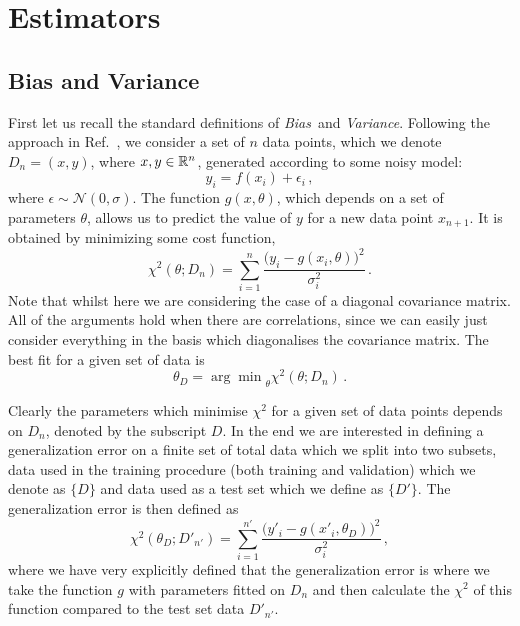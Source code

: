 \section{Estimators}
\label{sec:estimators}

\subsection{Bias and Variance}
\label{sec:BandV}

First let us recall the standard definitions of {\em Bias}\ and {\em Variance}.
Following the approach in Ref.~\cite{Mehta:2018dln}, we consider a set of $n$
data points, which we denote $D_n=\left(x,y\right)$, where $x,y \in \mathbb{R}^n$,
generated according to some noisy model:
\begin{equation}
    \label{eq:NoisyData}
    y_i = f(x_i) + \epsilon_i\, ,
\end{equation}
where $\epsilon\sim\mathcal{N}(0,\sigma)$. The function $g(x,\theta)$, which
depends on a set of parameters $\theta$, allows us to predict the value of $y$
for a new data point $x_{n+1}$. It is obtained by minimizing some cost function,
\eg
\begin{equation}
    \label{eq:CostFuncChi}
    \chi^2(\theta; D_n) = \sum_{i=1}^n
    \frac{\Big(
        y_i - g(x_i,\theta)
    \Big)^2}{\sigma_i^2}\, .
\end{equation}
Note that whilst here we are considering the case of a diagonal covariance matrix.
All of the arguments hold when there are correlations, since we can easily just
consider everything in the basis which diagonalises the covariance matrix. The
best fit for a given set of data is
\begin{equation}
    \label{eq:ThetaMin}
    \theta_D = {\arg\min}_\theta \chi^2(\theta; D_n)\, .
\end{equation}

Clearly the parameters which minimise $\chi^2$ for a given set of data points
depends on $D_n$, denoted by the subscript $D$. In the end we are interested in
defining a generalization error on a finite set of total data which we split
into two subsets, data used in the training procedure
(both training and validation) which we denote as $\{ D \}$
and data used as a test set which we define as $\{ D' \}$. The generalization
error is then defined as
\begin{equation}
    \label{eq:DefGenErr}
    \chi^2(\theta_D; D'_{n'}) = \sum_{i=1}^{n'}
    \frac{\Big(
        y'_i - g(x'_i,\theta_D)
    \Big)^2}{\sigma_i^2}\, ,
\end{equation}
where we have very explicitly defined that the generalization error is where we
take the function $g$ with parameters fitted on $D_n$ and then calculate the
$\chi^2$ of this function compared to the test set data $D'_{n'}$.

